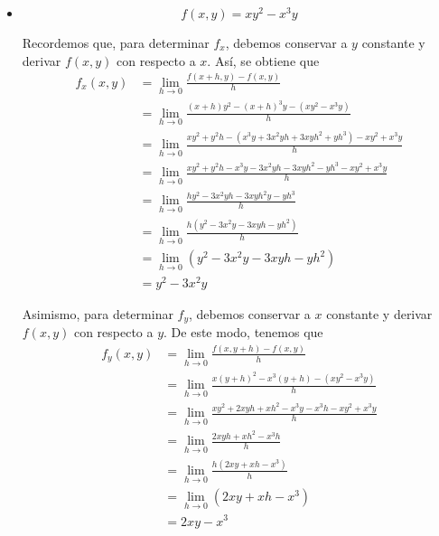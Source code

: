 \documentclass[12pt]{article}
\begin{document}
\begin{itemize}[format=\textbf]

\item $$f(x, y) = xy^2 - x^3y$$

  Recordemos que, para determinar $f_x$, debemos conservar a $y$ constante y derivar $f (x, y)$ con respecto a $x$. Así, se obtiene que
  \begin{align*}
    f_x(x,y)
    &= \lim_{h\to 0} \frac{f(x+h,y)-f(x,y)}{h} \\
    &= \lim_{h\to 0} \frac{(x+h)y^2 - (x+h)^3y- (xy^2 - x^3y)}{h} \\
    &= \lim_{h\to 0} \frac{xy^2+y^2h - (x^3y+3x^2yh+3xyh^2+yh^3) - xy^2 + x^3y}{h} \\
    &= \lim_{h\to 0} \frac{xy^2+y^2h - x^3y - 3x^2yh -3xyh^2 -yh^3 - xy^2 + x^3y}{h} \\
    &= \lim_{h\to 0} \frac{hy^2 - 3x^2yh -3xyh^2y - yh^3}{h} \\
    &= \lim_{h\to 0} \frac{h(y^2 - 3x^2y -3xyh - yh^2)}{h} \\
    &= \lim_{h\to 0} (y^2 - 3x^2y - 3xyh - yh^2) \\
    &= y^2 - 3x^2y
  \end{align*}
    

  Asimismo, para determinar $f_y$, debemos conservar a $x$ constante y derivar $f(x,y)$ con respecto a $y$. De este modo, tenemos que
  \begin{align*}
    f_y(x,y)
    &= \lim_{h\to 0} \frac{f(x,y+h)-f(x,y)}{h} \\
    &= \lim_{h\to 0} \frac{x(y+h)^2 - x^3(y+h) - (xy^2 - x^3y)}{h} \\
    &= \lim_{h\to 0} \frac{xy^2 + 2xyh + xh^2 - x^3y - x^3h - xy^2 + x^3y}{h} \\
    &= \lim_{h\to 0} \frac{2xyh + xh^2 - x^3h}{h} \\
    &= \lim_{h\to 0} \frac{h(2xy + xh - x^3)}{h} \\
    &= \lim_{h\to 0} (2xy + xh - x^3) \\
    &= 2xy - x^3
  \end{align*}

\end{itemize}

\section{}
\end{document}
